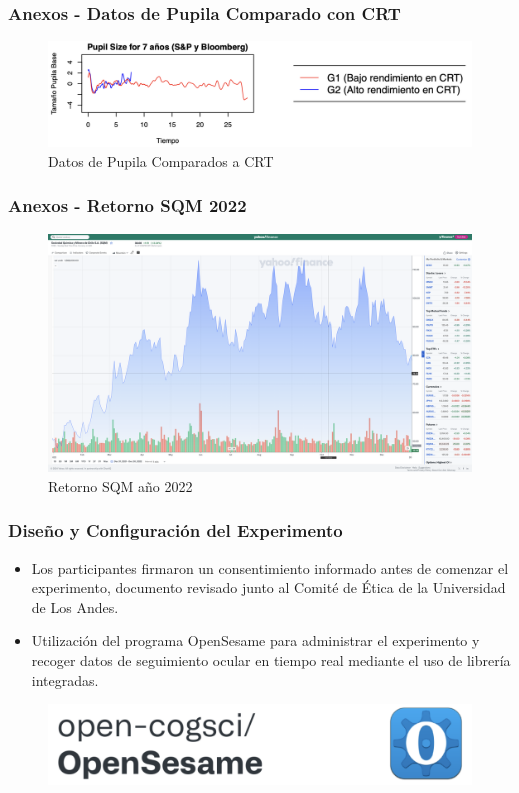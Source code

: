 \documentclass{beamer}
\begin{document}
\begin{frame}
    \frametitle{Anexos - Datos de Pupila Comparado con CRT}
    \begin{figure}
        \includegraphics[width=1\textwidth]{DatosPupilaCRT.png}
        \caption{Datos de Pupila Comparados a CRT}
    \end{figure}
\end{frame}

\begin{frame}
    \frametitle{Anexos - Retorno SQM 2022}
    \begin{figure}
        \includegraphics[width=1\textwidth]{retorno2022SQM.png}
        \caption{Retorno SQM año 2022}
    \end{figure}
\end{frame}

\begin{frame}
    \frametitle{Diseño y Configuración del Experimento}
    \begin{itemize}
        \item Los participantes firmaron un consentimiento informado antes de comenzar el experimento, documento revisado junto al Comité de Ética de la Universidad de Los Andes.
        \item Utilización del programa OpenSesame para administrar el experimento y recoger datos de seguimiento ocular en tiempo real mediante el uso de librería integradas.
    \end{itemize}
    \begin{figure}
            \centering
            \includegraphics[width=0.8\linewidth]{Latex/defensa/logo_opensesame.png}
        \end{figure}
\end{frame}


\end{document}
